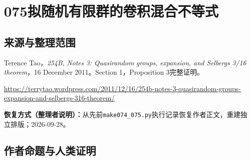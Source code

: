\documentclass[UTF8,11pt]{ctexart}
\theoremstyle{definition}
\begin{document}
\section*{075\quad 拟随机有限群的卷积混合不等式}
\subsection*{来源与整理范围}
Terence Tao，\emph{254B, Notes 3: Quasirandom groups, expansion, and Selberg\textquotesingle s 3/16 theorem}，16 December 2011。Section 1，Proposition 3完整证明。
\par\url{https://terrytao.wordpress.com/2011/12/16/254b-notes-3-quasirandom-groups-expansion-and-selbergs-316-theorem/}
\par\textbf{恢复方式（整理者说明）：}从先前\nolinkurl{make074_075.py}执行记录恢复作者正文，重建独立排版；2026-09-28。
\subsection*{作者命题与人类证明}
\end{document}
